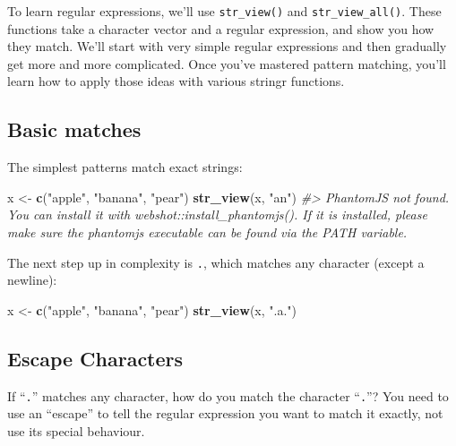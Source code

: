 \documentclass[]{book}
\newenvironment{Shaded}{\begin{snugshade}}{\end{snugshade}}
\newcommand{\CommentTok}[1]{\textcolor[rgb]{0.56,0.35,0.01}{\textit{#1}}}
\newcommand{\KeywordTok}[1]{\textcolor[rgb]{0.13,0.29,0.53}{\textbf{#1}}}
\newcommand{\NormalTok}[1]{#1}
\newcommand{\StringTok}[1]{\textcolor[rgb]{0.31,0.60,0.02}{#1}}
\begin{document}
To learn regular expressions, we'll use \texttt{str\_view()} and \texttt{str\_view\_all()}. These functions take a character vector and a regular expression, and show you how they match. We'll start with very simple regular expressions and then gradually get more and more complicated. Once you've mastered pattern matching, you'll learn how to apply those ideas with various stringr functions.

\hypertarget{basic-matches}{%
\subsection{Basic matches}\label{basic-matches}}

The simplest patterns match exact strings:

\begin{Shaded}
\begin{Highlighting}[]
\NormalTok{x <-}\StringTok{ }\KeywordTok{c}\NormalTok{(}\StringTok{"apple"}\NormalTok{, }\StringTok{"banana"}\NormalTok{, }\StringTok{"pear"}\NormalTok{)}
\KeywordTok{str_view}\NormalTok{(x, }\StringTok{"an"}\NormalTok{)}
\CommentTok{#> PhantomJS not found. You can install it with webshot::install_phantomjs(). If it is installed, please make sure the phantomjs executable can be found via the PATH variable.}
\end{Highlighting}
\end{Shaded}

\hypertarget{htmlwidget-febe03efa1a2d8d52a86}{}

The next step up in complexity is \texttt{.}, which matches any character (except a newline):

\begin{Shaded}
\begin{Highlighting}[]
\NormalTok{x <-}\StringTok{ }\KeywordTok{c}\NormalTok{(}\StringTok{"apple"}\NormalTok{, }\StringTok{"banana"}\NormalTok{, }\StringTok{"pear"}\NormalTok{)}
\KeywordTok{str_view}\NormalTok{(x, }\StringTok{".a."}\NormalTok{)}
\end{Highlighting}
\end{Shaded}

\hypertarget{htmlwidget-1fb4450895fe099f74a1}{}

\hypertarget{escape-characters}{%
\subsection{Escape Characters}\label{escape-characters}}

If ``\texttt{.}'' matches any character, how do you match the character ``\texttt{.}''? You need to use an ``escape'' to tell the regular expression you want to match it exactly, not use its special behaviour.
\end{document}
